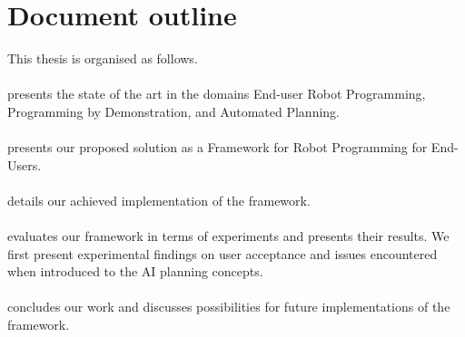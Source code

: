 \section{Document outline}
This thesis is organised as follows. 

\paragraph{} presents the state of the art in the domains End-user Robot Programming, Programming by Demonstration, and Automated Planning.

\paragraph{} presents our proposed solution as a Framework for Robot Programming for End-Users.

\paragraph{} details our achieved implementation of the framework. 

\paragraph{} evaluates our framework in terms of experiments and presents their results. We first present experimental findings on user acceptance and issues encountered when introduced to the AI planning concepts.

\paragraph{} concludes our work and discusses possibilities for future implementations of the framework.

